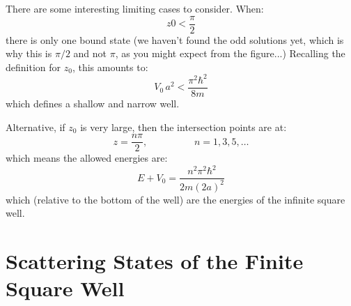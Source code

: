\documentclass[12pt]{book}
\begin{document}
There are some interesting limiting cases to consider.  When:
$$z0 < \frac{\pi}{2}$$
there is only one bound state (we haven't found the odd solutions yet, which is why this is $\pi/2$ and not $\pi$, as you might expect from the figure...)  Recalling the definition for $z_0$, this amounts to:
$$V_0\,a^2 < \frac{\pi^2 \hbar^2}{8m}$$
which defines a shallow and narrow well.

Alternative, if $z_0$ is very large, then the intersection points are at:
$$z = \frac{n\pi}{2}, \hspace{2cm} n=1,3,5,\ldots$$
which means the allowed energies are:
$$E + V_0 = \frac{n^2\pi^2\hbar^2}{2m(2a)^2}$$
which (relative to the bottom of the well) are the energies of the infinite square well.

\section{Scattering States of the Finite Square Well}
\end{document}
